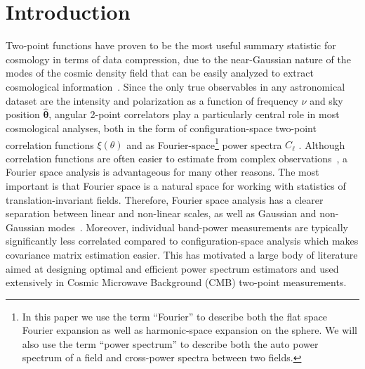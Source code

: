 \documentclass[usenatbib]{mnrasb}
\newcommand{\nv}{\hat{\boldsymbol{\theta}}}
\begin{document}
  \section{Introduction}\label{sec:intro}
    Two-point functions have proven to be the most useful summary statistic for cosmology in terms of data compression, due to the near-Gaussian nature of the modes of the cosmic density field that can be easily analyzed to extract cosmological information~\citep{1995PhRvL..74.4369B,1997PhRvD..55.5895T,2001PhRvD..64f3001T}. Since the only true observables in any astronomical dataset are the intensity and polarization as a function of frequency $\nu$ and sky position $\nv$, angular 2-point correlators play a particularly central role in most cosmological analyses, both in the form of configuration-space two-point correlation functions $\xi(\theta)$ and as Fourier-space\footnote{In this paper we use the term ``Fourier'' to describe both the flat space Fourier expansion as well as harmonic-space expansion on the sphere. We will also use the term ``power spectrum'' to describe both the auto power spectrum of a field and cross-power spectra between two fields. } power spectra $C_\ell$ \citep{2012MNRAS.427.1891A,2011PhRvD..84f3505B}.  Although correlation functions are often easier to estimate from complex observations~\citep{1993ApJ...412...64L}, a Fourier space analysis is advantageous for many other reasons. The most important is that Fourier space is a natural space for working with statistics of translation-invariant fields. Therefore, Fourier space analysis has a clearer separation between linear and non-linear scales, as well as Gaussian and non-Gaussian modes~\citep{2008PhRvD..77j3013H}. Moreover, individual band-power measurements are typically significantly less correlated compared to configuration-space analysis which makes covariance matrix estimation easier. This has motivated a large body of literature aimed at designing optimal and efficient power spectrum estimators and used extensively in Cosmic Microwave Background (CMB) two-point measurements.
    
\end{document}
